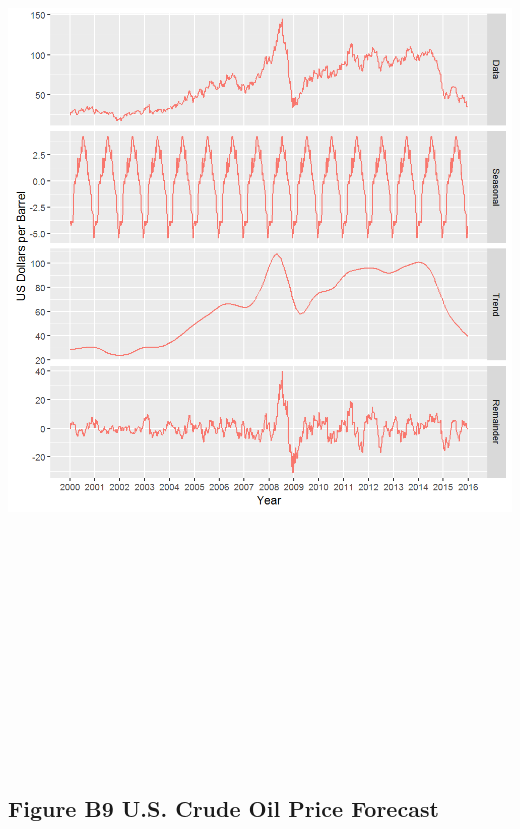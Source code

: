 \documentclass[]{article}
\begin{document}
\includegraphics[height=10.41667in]{images/EIAdata_us_crudeoil_pricedecomp.png}

\newpage

\subsection{Figure B9 U.S. Crude Oil Price
Forecast}\label{figure-b9-u.s.-crude-oil-price-forecast}
\end{document}
